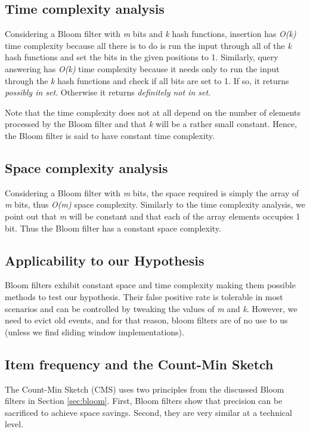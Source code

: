 \subsection*{Time complexity analysis}
Considering a Bloom filter with \textit{m} bits and \textit{k} hash functions, insertion has \textit{O(k)} time complexity because all there is to do is run the input through all of the \textit{k} hash functions and set the bits in the given positions to 1. Similarly, query answering has \textit{O(k)} time complexity because it needs only to run the input through the \textit{k} hash functions and check if all bits are set to 1. If so, it returns \textit{possibly in set}. Otherwise it returns \textit{definitely not in set}. 

Note that the time complexity does not at all depend on the number of elements processed by the Bloom filter and that \textit{k} will be a rather small constant. Hence, the Bloom filter is said to have constant time complexity.

\subsection*{Space complexity analysis}
Considering a Bloom filter with \textit{m} bits, the space required is simply the array of \textit{m} bits, thus \textit{O(m)} space complexity. Similarly to the time complexity analysis, we point out that \textit{m} will be constant and that each of the array elements occupies 1 bit. Thus the Bloom filter has a constant space complexity.

\subsection*{Applicability to our Hypothesis}
Bloom filters exhibit constant space and time complexity making them possible methods to test our hypothesis. Their false positive rate is tolerable in most scenarios and can be controlled by tweaking the values of \textit{m} and \textit{k}. However, we need to evict old events, and for that reason, bloom filters are of no use to us (unless we find sliding window implementations).

\subsection{Item frequency and the Count-Min Sketch}
The Count-Min Sketch (CMS) uses two principles from the discussed Bloom filters in Section \ref{sec:bloom}. First, Bloom filters show that precision can be sacrificed to achieve space savings. Second, they are very similar at a technical level.

